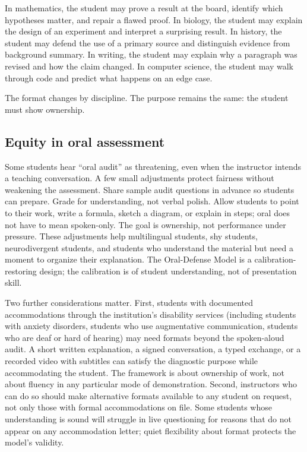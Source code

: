 \documentclass{SIAMbook2023}
\begin{document}
In mathematics, the student may prove a result at the board, identify which hypotheses matter, and repair a flawed proof. In biology, the student may explain the design of an experiment and interpret a surprising result. In history, the student may defend the use of a primary source and distinguish evidence from background summary. In writing, the student may explain why a paragraph was revised and how the claim changed. In computer science, the student may walk through code and predict what happens on an edge case.

The format changes by discipline. The purpose remains the same: the student must show ownership.

\subsection{Equity in oral assessment}
\label{i:subsec:oral-equity}%

Some students hear ``oral audit'' as threatening, even when the instructor intends a teaching conversation. A few small adjustments protect fairness without weakening the assessment. Share sample audit questions in advance so students can prepare. Grade for understanding, not verbal polish. Allow students to point to their work, write a formula, sketch a diagram, or explain in steps; oral does not have to mean spoken-only. The goal is ownership, not performance under pressure. These adjustments help multilingual students, shy students, neurodivergent students, and students who understand the material but need a moment to organize their explanation. The Oral-Defense Model is a calibration-restoring design; the calibration is of student understanding, not of presentation skill.

Two further considerations matter. First, students with documented accommodations through the institution's disability services (including students with anxiety disorders, students who use augmentative communication, students who are deaf or hard of hearing) may need formats beyond the spoken-aloud audit. A short written explanation, a signed conversation, a typed exchange, or a recorded video with subtitles can satisfy the diagnostic purpose while accommodating the student. The framework is about ownership of work, not about fluency in any particular mode of demonstration. Second, instructors who can do so should make alternative formats available to any student on request, not only those with formal accommodations on file. Some students whose understanding is sound will struggle in live questioning for reasons that do not appear on any accommodation letter; quiet flexibility about format protects the model's validity.
\end{document}
